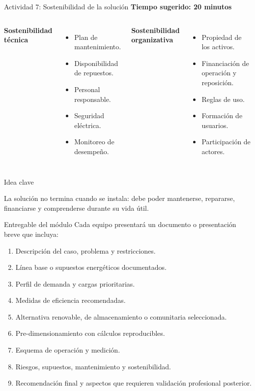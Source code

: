 \documentclass[aspectratio=169,10pt]{beamer}
\newcommand{\idea}[1]{
\begin{block}{Idea clave}
#1
\end{block}
}
\begin{document}
\begin{frame}{Actividad 7: Sostenibilidad de la solución}
\textbf{Tiempo sugerido: 20 minutos}

\begin{columns}
\textbf{Sostenibilidad técnica}
\begin{itemize}
    \item Plan de mantenimiento.
    \item Disponibilidad de repuestos.
    \item Personal responsable.
    \item Seguridad eléctrica.
    \item Monitoreo de desempeño.
\end{itemize}

\textbf{Sostenibilidad organizativa}
\begin{itemize}
    \item Propiedad de los activos.
    \item Financiación de operación y reposición.
    \item Reglas de uso.
    \item Formación de usuarios.
    \item Participación de actores.
\end{itemize}
\end{columns}

\vspace{0.35cm}

\idea{
La solución no termina cuando se instala: debe poder mantenerse, repararse, financiarse y comprenderse durante su vida útil.
}
\end{frame}

\begin{frame}{Entregable del módulo}
Cada equipo presentará un documento o presentación breve que incluya:

\begin{enumerate}
    \item Descripción del caso, problema y restricciones.
    \item Línea base o supuestos energéticos documentados.
    \item Perfil de demanda y cargas prioritarias.
    \item Medidas de eficiencia recomendadas.
    \item Alternativa renovable, de almacenamiento o comunitaria seleccionada.
    \item Pre-dimensionamiento con cálculos reproducibles.
    \item Esquema de operación y medición.
    \item Riesgos, supuestos, mantenimiento y sostenibilidad.
    \item Recomendación final y aspectos que requieren validación profesional posterior.
\end{enumerate}
\end{frame}
\end{document}
